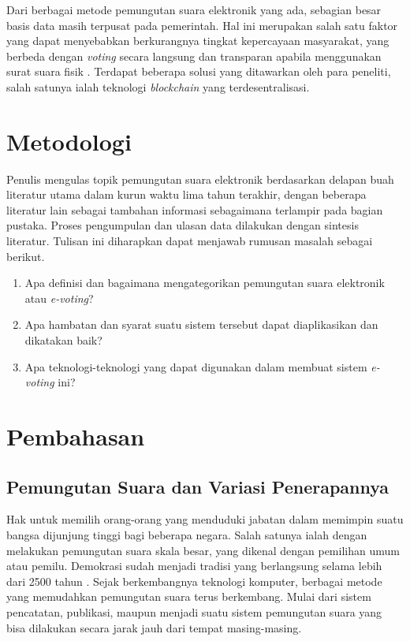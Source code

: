 \documentclass[12pt, a4paper, final]{article}
\begin{document}
Dari berbagai metode pemungutan suara elektronik yang ada, sebagian besar basis data masih terpusat pada pemerintah. Hal ini merupakan salah satu faktor yang dapat menyebabkan berkurangnya tingkat kepercayaan masyarakat, yang berbeda dengan \textit{voting} secara langsung dan transparan apabila menggunakan surat suara fisik \citep{8651451}. Terdapat beberapa solusi yang ditawarkan oleh para peneliti, salah satunya ialah teknologi \textit{blockchain} yang terdesentralisasi.

\section{Metodologi}

Penulis mengulas topik pemungutan suara elektronik berdasarkan delapan buah literatur utama dalam kurun waktu lima tahun terakhir, dengan beberapa literatur lain sebagai tambahan informasi sebagaimana terlampir pada bagian pustaka. Proses pengumpulan dan ulasan data dilakukan dengan sintesis literatur. Tulisan ini diharapkan dapat menjawab rumusan masalah sebagai berikut.
\begin{enumerate}
    \setlength\itemsep{-0.5em}
    \item Apa definisi dan bagaimana mengategorikan pemungutan suara elektronik atau \textit{e-voting}?
    \item Apa hambatan dan syarat suatu sistem tersebut dapat diaplikasikan dan dikatakan baik?
    \item Apa teknologi-teknologi yang dapat digunakan dalam membuat sistem \textit{e-voting} ini?
\end{enumerate}
\section{Pembahasan}

\subsection{Pemungutan Suara dan Variasi Penerapannya}

Hak untuk memilih orang-orang yang menduduki jabatan dalam memimpin suatu bangsa dijunjung tinggi bagi beberapa negara. Salah satunya ialah dengan melakukan pemungutan suara skala besar, yang dikenal dengan pemilihan umum atau pemilu. Demokrasi sudah menjadi tradisi yang berlangsung selama lebih dari 2500 tahun \citep{hansen2005tradition, review1}. Sejak berkembangnya teknologi komputer, berbagai metode yang memudahkan pemungutan suara terus berkembang. Mulai dari sistem pencatatan, publikasi, maupun menjadi suatu sistem pemungutan suara yang bisa dilakukan secara jarak jauh dari tempat masing-masing.
\end{document}
